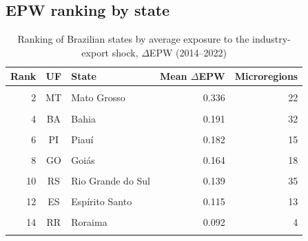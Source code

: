 \documentclass[
	11pt,				%
	oneside,			%
	a4paper,			%
	english,			%
	english				%
	]{abntex2ppgsi}
\theoremstyle{plain}
\theoremstyle{remark}
\theoremstyle{plain}%
\theoremstyle{remark}%
\begin{document}
\begin{apendicesenv}
\chapter{EPW ranking by state}
\label{ch:epw-ranking-state}
\begin{table}[!h]
\centering
\caption{\label{tab:tab:epw_ranking}Ranking of Brazilian states by average exposure to the industry-export shock, $\Delta$EPW (2014--2022)}
\centering
\fontsize{10}{12}\selectfont
\begin{threeparttable}
\begin{tabular}[t]{rc>{\raggedright\arraybackslash}p{5cm}rr}
\toprule
Rank & UF & State & Mean $\Delta$EPW & Microregions\\
\midrule
\cellcolor{gray!10}{1} & \cellcolor{gray!10}{SE} & \cellcolor{gray!10}{Sergipe} & \cellcolor{gray!10}{0.407} & \cellcolor{gray!10}{13}\\
2 & MT & Mato Grosso & 0.336 & 22\\
\cellcolor{gray!10}{3} & \cellcolor{gray!10}{AM} & \cellcolor{gray!10}{Amazonas} & \cellcolor{gray!10}{0.310} & \cellcolor{gray!10}{12}\\
4 & BA & Bahia & 0.191 & 32\\
\cellcolor{gray!10}{5} & \cellcolor{gray!10}{RJ} & \cellcolor{gray!10}{Rio de Janeiro} & \cellcolor{gray!10}{0.183} & \cellcolor{gray!10}{18}\\
6 & PI & Piauí & 0.182 & 15\\
\cellcolor{gray!10}{7} & \cellcolor{gray!10}{PR} & \cellcolor{gray!10}{Paraná} & \cellcolor{gray!10}{0.170} & \cellcolor{gray!10}{39}\\
8 & GO & Goiás & 0.164 & 18\\
\cellcolor{gray!10}{9} & \cellcolor{gray!10}{RN} & \cellcolor{gray!10}{Rio Grande do Norte} & \cellcolor{gray!10}{0.140} & \cellcolor{gray!10}{19}\\
10 & RS & Rio Grande do Sul & 0.139 & 35\\
\cellcolor{gray!10}{11} & \cellcolor{gray!10}{SP} & \cellcolor{gray!10}{São Paulo} & \cellcolor{gray!10}{0.121} & \cellcolor{gray!10}{63}\\
12 & ES & Espírito Santo & 0.115 & 13\\
\cellcolor{gray!10}{13} & \cellcolor{gray!10}{SC} & \cellcolor{gray!10}{Santa Catarina} & \cellcolor{gray!10}{0.097} & \cellcolor{gray!10}{20}\\
14 & RR & Roraima & 0.092 & 4\\
\cellcolor{gray!10}{15} & \cellcolor{gray!10}{TO} & \cellcolor{gray!10}{Tocantins} & \cellcolor{gray!10}{0.092} & \cellcolor{gray!10}{8}\\

\end{tabular}
\end{threeparttable}
\end{table}
\end{apendicesenv}
\end{document}
